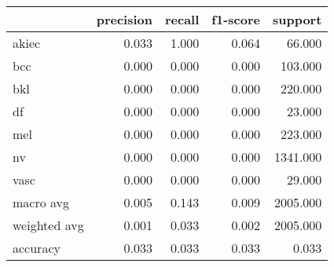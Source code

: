 \begin{tabular}{lrrrr}
\toprule
 & precision & recall & f1-score & support \\
\midrule
akiec & 0.033 & 1.000 & 0.064 & 66.000 \\
bcc & 0.000 & 0.000 & 0.000 & 103.000 \\
bkl & 0.000 & 0.000 & 0.000 & 220.000 \\
df & 0.000 & 0.000 & 0.000 & 23.000 \\
mel & 0.000 & 0.000 & 0.000 & 223.000 \\
nv & 0.000 & 0.000 & 0.000 & 1341.000 \\
vasc & 0.000 & 0.000 & 0.000 & 29.000 \\
macro avg & 0.005 & 0.143 & 0.009 & 2005.000 \\
weighted avg & 0.001 & 0.033 & 0.002 & 2005.000 \\
accuracy & 0.033 & 0.033 & 0.033 & 0.033 \\
\bottomrule
\end{tabular}
